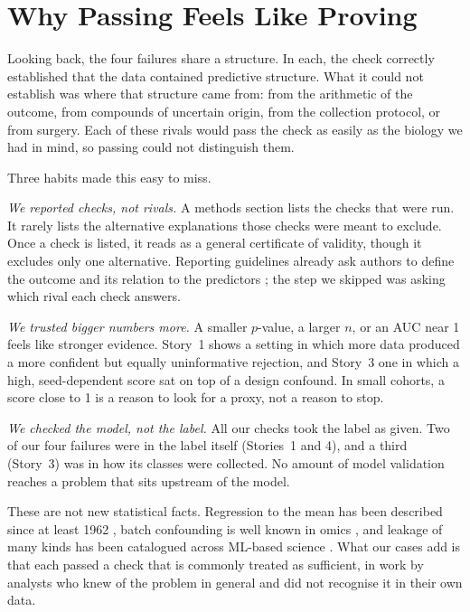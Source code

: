 \documentclass[conference]{IEEEtran}
\begin{document}
\section{Why Passing Feels Like Proving}
\label{sec:why}

Looking back, the four failures share a structure. In each, the check
correctly established that the data contained predictive structure. What it
could not establish was where that structure came from: from the arithmetic
of the outcome, from compounds of uncertain origin, from the collection
protocol, or from surgery. Each of these rivals would pass the check as
easily as the biology we had in mind, so passing could not distinguish them.

Three habits made this easy to miss.

\emph{We reported checks, not rivals.} A methods section lists the checks
that were run. It rarely lists the alternative explanations those checks were
meant to exclude. Once a check is listed, it reads as a general certificate
of validity, though it excludes only one alternative. Reporting guidelines
already ask authors to define the outcome and its relation to the predictors
\cite{collins2024}; the step we skipped was asking which rival each check
answers.

\emph{We trusted bigger numbers more.} A smaller $p$-value, a larger $n$, or
an AUC near 1 feels like stronger evidence. Story~1 shows a setting in which
more data produced a more confident but equally uninformative rejection, and
Story~3 one in which a high, seed-dependent score sat on top of a design
confound. In small cohorts, a score close to 1 is a reason to look for a
proxy, not a reason to stop.

\emph{We checked the model, not the label.} All our checks took the label as
given. Two of our four failures were in the label itself (Stories~1 and 4),
and a third (Story~3) was in how its classes were collected. No amount of
model validation reaches a problem that sits upstream of the model.

These are not new statistical facts. Regression to the mean has been
described since at least 1962 \cite{oldham1962}, batch confounding is
well known in omics \cite{leek2010, han2022}, and leakage of many kinds has
been catalogued across ML-based science \cite{kapoor2023}. What our cases add
is that each passed a check that is commonly treated as sufficient, in work
by analysts who knew of the problem in general and did not recognise it in
their own data.
\end{document}
